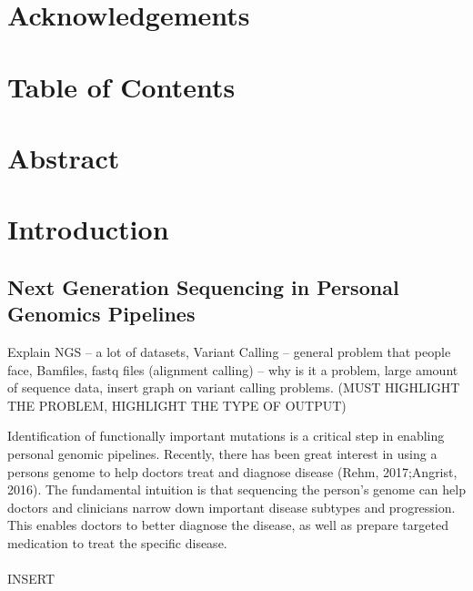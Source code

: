 \documentclass{article}
\begin{document}
\section*{Acknowledgements}
\newpage
\section*{Table of Contents}
\tableofcontents
\newpage
\section*{Abstract}
\doublespace
\normalsize
{} 
\section{Introduction}
\subsection{Next Generation Sequencing in Personal Genomics Pipelines}
Explain NGS – a lot of datasets, Variant Calling – general problem that people face, Bamfiles, fastq files (alignment calling) – why is it a problem, large amount of sequence data, insert graph on variant calling problems. (MUST HIGHLIGHT THE PROBLEM, HIGHLIGHT THE TYPE OF OUTPUT) 


Identification of functionally important mutations is a critical step in enabling personal genomic pipelines. Recently, there has been great interest in using a persons genome to help doctors treat and diagnose disease (Rehm, 2017;Angrist, 2016). The fundamental intuition is that sequencing the person's genome can help doctors and clinicians narrow down important disease subtypes and progression. This enables doctors to better diagnose the disease, as well as prepare targeted medication to treat the specific disease. \\\\ INSERT
\end{document}
